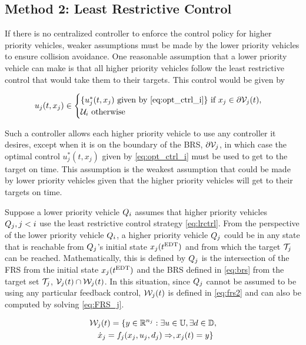 \subsection{Method 2: Least Restrictive Control \label{sec:lrc}}
If there is no centralized controller to enforce the control policy for higher priority vehicles, weaker assumptions must be made by the lower priority vehicles to ensure collision avoidance. One reasonable assumption that a lower priority vehicle can make is that all higher priority vehicles follow the least restrictive control that would take them to their targets. This control would be given by 

\begin{equation}
\label{eq:lrctrl} %
u_j(t, x_j)\in \begin{cases} \{u_j^*(t, x_j) \text{ given by } \eqref{eq:opt_ctrl_i}\} \text{ if } x_j\in \partial \brs_j(t), \\
\cset_i  \text{ otherwise}
\end{cases}
\end{equation}

Such a controller allows each higher priority vehicle to use any controller it desires, except when it is on the boundary of the BRS, $\partial \mathcal{V}_j$, in which case the optimal control $u_j^*(t, x_j)$ given by \eqref{eq:opt_ctrl_i} must be used to get to the target on time. This assumption is the weakest assumption that could be made by lower priority vehicles given that the higher priority vehicles will get to their targets on time.

Suppose a lower priority vehicle $Q_i$ assumes that higher priority vehicles $Q_j, j < i$ use the least restrictive control strategy \eqref{eq:lrctrl}. From the perspective of the lower priority vehicle $Q_i$, a higher priority vehicle $Q_j$ could be in any state that is reachable from $Q_j$'s initial state $x_j(t^\text{EDT})$ and from which the target $\mathcal{T}_j$ can be reached. Mathematically, this is defined by $Q_j$ is the intersection of the FRS from the initial state $x_j(t^\text{EDT})$ and the BRS defined in \eqref{eq:brs} from the target set $\mathcal{T}_j$, $\mathcal{V}_j(t) \cap \mathcal{W}_j(t)$. In this situation, since $Q_j$ cannot be assumed to be using any particular feedback control, $\mathcal{W}_j(t)$ is defined in \eqref{eq:frs2} and can also be computed by solving \eqref{eq:FRS_j}.

\begin{equation}
\label{eq:frs2}
\begin{aligned}
&\mathcal{W}_j(t) = \{y \in \mathbb{R}^{n_j}: \exists u \in \mathbb{U}, \exists d \in \mathbb{D}, \\
& \quad \dot{x}_j = f_j(x_j, u_j, d_j) \Rightarrow, x_j(t) = y\}
\end{aligned}
\end{equation}

